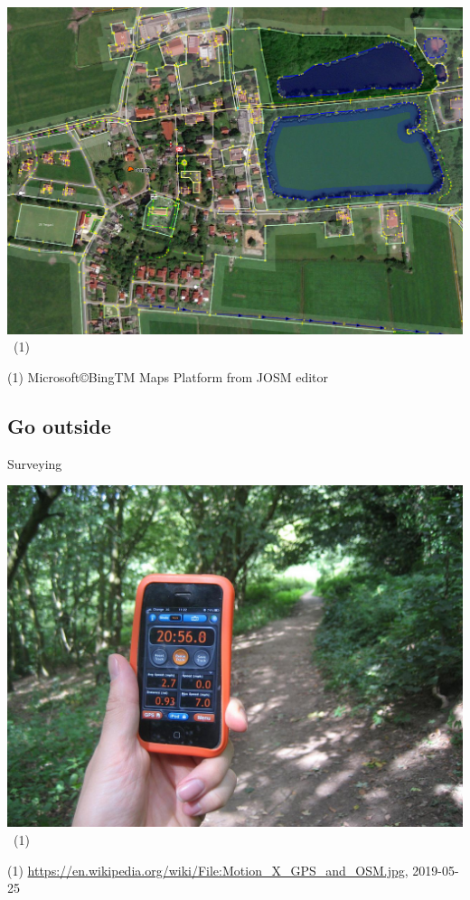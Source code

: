 \documentclass{beamer}
\begin{document}
	\begin{frame}
		\begin{center}
			\includegraphics[width=0.8\linewidth,height=0.8\textheight,keepaspectratio]{images/trace_imagery.png}~\tiny{(1)}
		\end{center}
		{\tiny (1) Microsoft\copyright BingTM Maps Platform from JOSM editor}
	\end{frame}
	
	\subsection{Go outside}
	
	\begin{frame}{Surveying}
		\begin{center}
			\includegraphics[width=0.8\linewidth,height=0.8\textheight,keepaspectratio]{images/surveying}~\tiny{(1)}
		\end{center}
		{\tiny (1) \url{https://en.wikipedia.org/wiki/File:Motion\_X\_GPS\_and\_OSM.jpg}, 2019-05-25}
	\end{frame}
\end{document}
